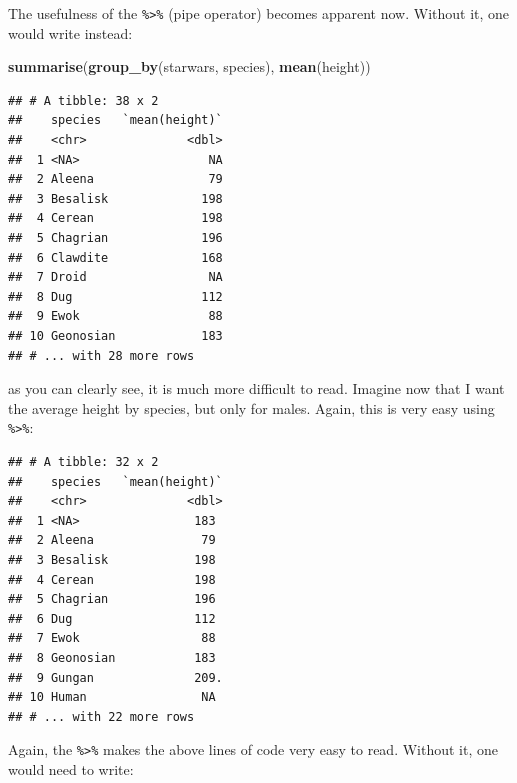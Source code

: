 \documentclass[]{gitbook}
\newenvironment{Shaded}{\begin{snugshade}}{\end{snugshade}}
\newcommand{\KeywordTok}[1]{\textcolor[rgb]{0.13,0.29,0.53}{\textbf{#1}}}
\newcommand{\NormalTok}[1]{#1}
\newcommand{\OperatorTok}[1]{\textcolor[rgb]{0.81,0.36,0.00}{\textbf{#1}}}
\newcommand{\StringTok}[1]{\textcolor[rgb]{0.31,0.60,0.02}{#1}}
\begin{document}
The usefulness of the \texttt{\%\textgreater{}\%} (pipe operator) becomes apparent now. Without it, one would write
instead:

\begin{Shaded}
\begin{Highlighting}[]
\KeywordTok{summarise}\NormalTok{(}\KeywordTok{group_by}\NormalTok{(starwars, species), }\KeywordTok{mean}\NormalTok{(height))}
\end{Highlighting}
\end{Shaded}

\begin{verbatim}
## # A tibble: 38 x 2
##    species   `mean(height)`
##    <chr>              <dbl>
##  1 <NA>                  NA
##  2 Aleena                79
##  3 Besalisk             198
##  4 Cerean               198
##  5 Chagrian             196
##  6 Clawdite             168
##  7 Droid                 NA
##  8 Dug                  112
##  9 Ewok                  88
## 10 Geonosian            183
## # ... with 28 more rows
\end{verbatim}

as you can clearly see, it is much more difficult to read. Imagine now that I want the average height
by species, but only for males. Again, this is very easy using \texttt{\%\textgreater{}\%}:

\begin{Shaded}
\end{Shaded}

\begin{verbatim}
## # A tibble: 32 x 2
##    species   `mean(height)`
##    <chr>              <dbl>
##  1 <NA>                183 
##  2 Aleena               79 
##  3 Besalisk            198 
##  4 Cerean              198 
##  5 Chagrian            196 
##  6 Dug                 112 
##  7 Ewok                 88 
##  8 Geonosian           183 
##  9 Gungan              209.
## 10 Human                NA 
## # ... with 22 more rows
\end{verbatim}

Again, the \texttt{\%\textgreater{}\%} makes the above lines of code very easy to read. Without it, one would need to write:
\end{document}
